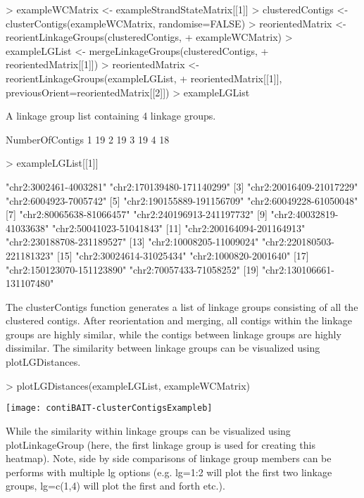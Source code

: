 \documentclass{article}
\begin{document}
\begin{Schunk}
\begin{Sinput}
> exampleWCMatrix <- exampleStrandStateMatrix[[1]]
> clusteredContigs <- clusterContigs(exampleWCMatrix, randomise=FALSE)
> reorientedMatrix <- reorientLinkageGroups(clusteredContigs,
+  exampleWCMatrix)
> exampleLGList <- mergeLinkageGroups(clusteredContigs,
+ reorientedMatrix[[1]])
> reorientedMatrix <- reorientLinkageGroups(exampleLGList,
+  reorientedMatrix[[1]], previousOrient=reorientedMatrix[[2]])
> exampleLGList
\end{Sinput}
\begin{Soutput}
A linkage group list containing  4  linkage groups.

  NumberOfContigs
1              19
2              19
3              19
4              18
\end{Soutput}
\begin{Sinput}
> exampleLGList[[1]]
\end{Sinput}
\begin{Soutput}
 [1] "chr2:3002461-4003281"     "chr2:170139480-171140299"
 [3] "chr2:20016409-21017229"   "chr2:6004923-7005742"    
 [5] "chr2:190155889-191156709" "chr2:60049228-61050048"  
 [7] "chr2:80065638-81066457"   "chr2:240196913-241197732"
 [9] "chr2:40032819-41033638"   "chr2:50041023-51041843"  
[11] "chr2:200164094-201164913" "chr2:230188708-231189527"
[13] "chr2:10008205-11009024"   "chr2:220180503-221181323"
[15] "chr2:30024614-31025434"   "chr2:1000820-2001640"    
[17] "chr2:150123070-151123890" "chr2:70057433-71058252"  
[19] "chr2:130106661-131107480"
\end{Soutput}
\end{Schunk}


The clusterContigs function generates a list of linkage groups consisting of all the clustered contigs.  After reorientation and merging, all contigs within the linkage groups are highly similar, while the contigs between linkage groups are highly dissimilar.  The similarity between linkage groups can be visualized using plotLGDistances.

\begin{Schunk}
\begin{Sinput}
> plotLGDistances(exampleLGList, exampleWCMatrix)
\end{Sinput}
\end{Schunk}
\texttt{[image: contiBAIT-clusterContigsExampleb]}


While the similarity within linkage groups can be visualized using plotLinkageGroup (here, the first linkage group is used for creating this heatmap). Note, side by side comparisons of linkage group members can be performs with multiple lg options (e.g. lg=1:2 will plot the first two linkage groups, lg=c(1,4) will plot the first and forth etc.).
\end{document}
